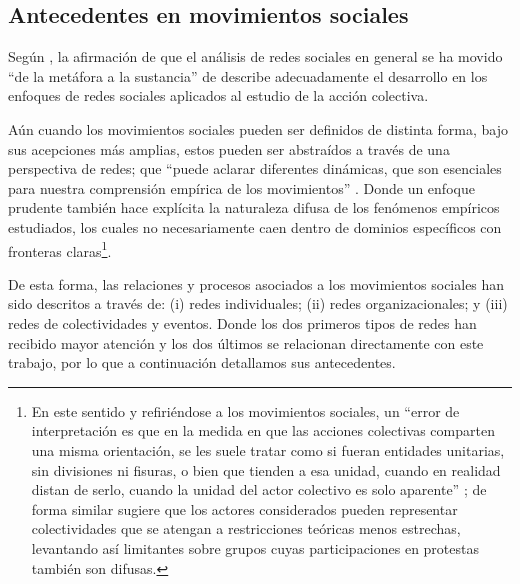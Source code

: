 \documentclass[letterpaper, 11pt]{book}
\theoremstyle{definition}
\theoremstyle{remark}
\begin{document}
\subsection{Antecedentes en movimientos sociales}
\label{sec:antecedentes}


Según \citet{2003_Diani_SocialNetworks}, la afirmación de que el análisis de redes sociales en general se ha movido ``de la metáfora a la sustancia'' de \citet{1988_Wellman_StructuralAnalysis} describe adecuadamente el desarrollo en los enfoques de redes sociales aplicados al estudio de la acción colectiva. 


Aún cuando los movimientos sociales pueden ser definidos de distinta forma, bajo sus acepciones más amplias, estos pueden ser abstraídos a través de una perspectiva de redes; que ``puede aclarar diferentes dinámicas, que son esenciales para nuestra comprensión empírica de los movimientos'' \citep[6]{2003_Diani_SocialNetworks}. 
Donde un enfoque prudente también hace explícita la naturaleza difusa de los fenómenos empíricos estudiados, los cuales no necesariamente caen dentro de dominios específicos con fronteras claras\footnote{
    En este sentido y refiriéndose a los movimientos sociales, un ``error de interpretación es que en la medida en que las acciones colectivas comparten una misma orientación, se les suele tratar como si fueran entidades unitarias, sin divisiones ni fisuras, o bien que tienden a esa unidad, cuando en realidad distan de serlo, cuando la unidad del actor colectivo es solo aparente'' \citep[5]{2016_Cadena_OMS}; 
    de forma similar \citet{2003_Diani_SocialNetworks} sugiere que los actores considerados pueden representar colectividades que se atengan a restricciones teóricas menos estrechas, levantando así limitantes sobre grupos cuyas participaciones en protestas también son difusas. 
}. 


De esta forma, las relaciones y procesos asociados a los movimientos sociales han sido descritos a través de: 
(i) redes individuales; 
(ii) redes organizacionales; y 
(iii) redes de colectividades y eventos. 
Donde los dos primeros tipos de redes han recibido mayor atención y los dos últimos se relacionan directamente con este trabajo, por lo que a continuación detallamos sus antecedentes. 
\end{document}
